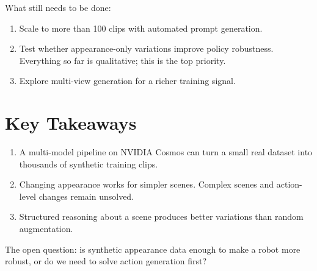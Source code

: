 What still needs to be done:
\begin{enumerate}
    \item Scale to more than 100 clips with automated prompt generation.
    \item Test whether appearance-only variations improve policy robustness. Everything so far is qualitative; this is the top priority.
    \item Explore multi-view generation for a richer training signal.
\end{enumerate}

\section{Key Takeaways}
\label{sec:takeaways}

\begin{enumerate}
    \item A multi-model pipeline on NVIDIA Cosmos can turn a small real dataset into thousands of synthetic training clips.
    \item Changing appearance works for simpler scenes. Complex scenes and action-level changes remain unsolved.
    \item Structured reasoning about a scene produces better variations than random augmentation.
\end{enumerate}

The open question: is synthetic appearance data enough to make a robot more robust, or do we need to solve action generation first?

